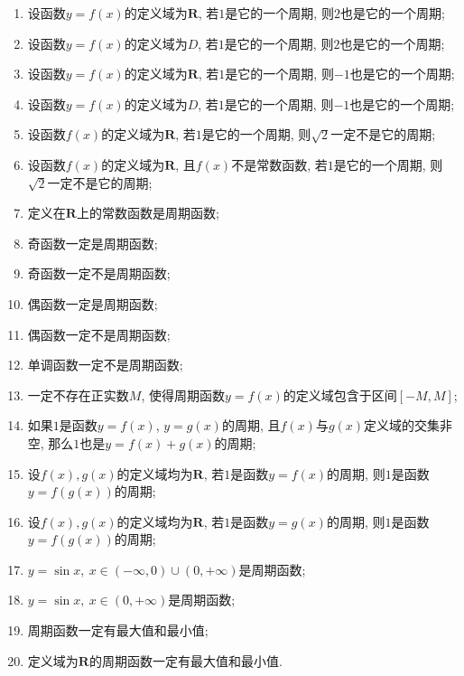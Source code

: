 \begin{enumerate}[\blank{30}(1)]
\item 设函数$y=f(x)$的定义域为$\mathbf{R}$, 若$1$是它的一个周期, 则$2$也是它的一个周期;\\ 
\item 设函数$y=f(x)$的定义域为$D$, 若$1$是它的一个周期, 则$2$也是它的一个周期;\\ 
\item 设函数$y=f(x)$的定义域为$\mathbf{R}$, 若$1$是它的一个周期, 则$-1$也是它的一个周期;\\ 
\item 设函数$y=f(x)$的定义域为$D$, 若$1$是它的一个周期, 则$-1$也是它的一个周期;\\ 
\item 设函数$f(x)$的定义域为$\mathbf{R}$, 若$1$是它的一个周期, 则$\sqrt{2}$一定不是它的周期;\\ 
\item 设函数$f(x)$的定义域为$\mathbf{R}$, 且$f(x)$不是常数函数, 若$1$是它的一个周期, 则$\sqrt{2}$一定不是它的周期;\\ 
\item 定义在$\mathbf{R}$上的常数函数是周期函数;\\ 
\item 奇函数一定是周期函数;\\ 
\item 奇函数一定不是周期函数;\\ 
\item 偶函数一定是周期函数;\\ 
\item 偶函数一定不是周期函数;\\ 
\item 单调函数一定不是周期函数;\\ 
\item 一定不存在正实数$M$, 使得周期函数$y=f(x)$的定义域包含于区间$[-M,M]$;\\ 
\item 如果$1$是函数$y=f(x)$, $y=g(x)$的周期, 且$f(x)$与$g(x)$定义域的交集非空, 那么$1$也是$y=f(x)+g(x)$的周期;\\ 
\item 设$f(x),g(x)$的定义域均为$\mathbf{R}$, 若$1$是函数$y=f(x)$的周期, 则$1$是函数$y=f(g(x))$的周期;\\ 
\item 设$f(x),g(x)$的定义域均为$\mathbf{R}$, 若$1$是函数$y=g(x)$的周期, 则$1$是函数$y=f(g(x))$的周期;\\ 
\item $y=\sin x,\ x\in (-\infty,0)\cup (0,+\infty)$是周期函数;\\ 
\item $y=\sin x,\ x\in (0,+\infty)$是周期函数;\\ 
\item 周期函数一定有最大值和最小值;\\ 
\item 定义域为$\mathbf{R}$的周期函数一定有最大值和最小值.\\ 
\end{enumerate}
